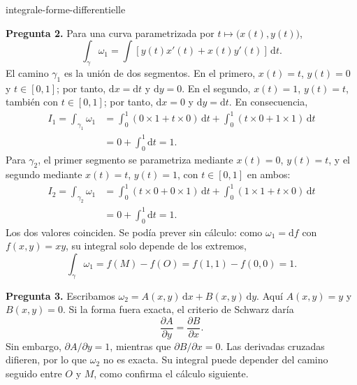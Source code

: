 \begin{exo}{integrale-forme-differentielle}
\begin{solution}
\textbf{Pregunta 2.} Para una curva parametrizada por $t\mapsto\bigl(x(t),y(t)\bigr)$,
\[\int_\gamma\omega_1=\int\left[y(t)x'(t)+x(t)y'(t)\right]\,\mathrm{d}t.\]
El camino $\gamma_1$ es la unión de dos segmentos. En el primero, $x(t)=t$,
$y(t)=0$ y $t\in[0,1]$; por tanto, $\mathrm{d}x=\mathrm{d}t$ y
$\mathrm{d}y=0$. En el segundo, $x(t)=1$, $y(t)=t$, también con $t\in[0,1]$;
por tanto, $\mathrm{d}x=0$ y $\mathrm{d}y=\mathrm{d}t$. En consecuencia,
\[
\begin{aligned}
I_1=\int_{\gamma_1}\omega_1
&=\int_0^1(0\times1+t\times0)\,\mathrm{d}t+\int_0^1(t\times0+1\times1)\,\mathrm{d}t\\
&=0+\int_0^1\mathrm{d}t=1.
\end{aligned}
\]
Para $\gamma_2$, el primer segmento se parametriza mediante $x(t)=0$,
$y(t)=t$, y el segundo mediante $x(t)=t$, $y(t)=1$, con $t\in[0,1]$ en ambos:
\[
\begin{aligned}
I_2=\int_{\gamma_2}\omega_1
&=\int_0^1(t\times0+0\times1)\,\mathrm{d}t+\int_0^1(1\times1+t\times0)\,\mathrm{d}t\\
&=0+\int_0^1\mathrm{d}t=1.
\end{aligned}
\]
Los dos valores coinciden. Se podía prever sin cálculo: como
$\omega_1=\mathrm{d}f$ con $f(x,y)=xy$, su integral solo depende de los extremos,
\[\int_\gamma\omega_1=f(M)-f(O)=f(1,1)-f(0,0)=1.\]

\textbf{Pregunta 3.} Escribamos $\omega_2=A(x,y)\,\mathrm{d}x+B(x,y)\,\mathrm{d}y$.
Aquí $A(x,y)=y$ y $B(x,y)=0$. Si la forma fuera exacta, el criterio de Schwarz daría
\[\frac{\partial A}{\partial y}=\frac{\partial B}{\partial x}.\]
Sin embargo, $\partial A/\partial y=1$, mientras que $\partial B/\partial x=0$.
Las derivadas cruzadas difieren, por lo que $\omega_2$ no es exacta. Su integral
puede depender del camino seguido entre $O$ y $M$, como confirma el cálculo siguiente.


\end{solution}
\end{exo}
